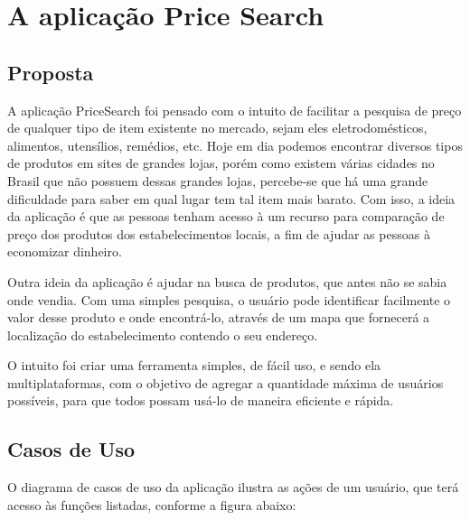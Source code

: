 \section{A aplicação Price Search}

\subsection{Proposta}
A aplicação PriceSearch foi pensado com o intuito de facilitar a pesquisa de preço de qualquer tipo de item existente no mercado, sejam eles eletrodomésticos, alimentos, utensílios, remédios, etc. Hoje em dia podemos encontrar diversos tipos de produtos em sites de grandes lojas, porém como existem várias cidades no Brasil que não possuem dessas grandes lojas, percebe-se que há uma grande dificuldade para saber em qual lugar tem tal item mais barato. Com isso, a ideia da aplicação é que as pessoas tenham acesso à um recurso para comparação de preço dos produtos dos estabelecimentos locais, a fim de ajudar as pessoas à economizar dinheiro. 

Outra ideia da aplicação é ajudar na busca de produtos, que antes não se sabia onde vendia. Com uma simples pesquisa, o usuário pode identificar facilmente o valor desse produto e onde encontrá-lo, através de um mapa que fornecerá a localização do estabelecimento contendo o seu endereço.

O intuito foi criar uma ferramenta simples, de fácil uso, e sendo ela multiplataformas, com o objetivo de agregar a quantidade máxima de usuários possíveis, para que todos possam usá-lo de maneira eficiente e rápida.

\subsection{Casos de Uso}
O diagrama de casos de uso da aplicação ilustra as ações de um usuário, que terá acesso às funções listadas, conforme a figura abaixo:

